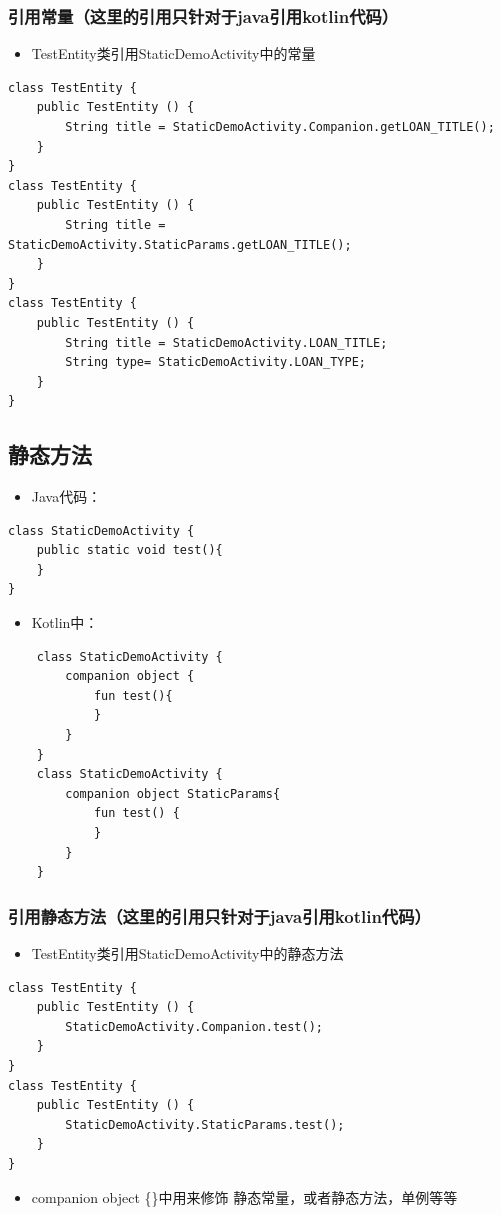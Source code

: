\documentclass[9pt, b5paper]{article}
\begin{document}
\subsubsection{引用常量（这里的引用只针对于java引用kotlin代码）}
\label{sec-2-1-3}
\begin{itemize}
\item TestEntity类引用StaticDemoActivity中的常量
\end{itemize}
\begin{verbatim}
class TestEntity {
    public TestEntity () {
        String title = StaticDemoActivity.Companion.getLOAN_TITLE();
    }
}
class TestEntity {
    public TestEntity () {
        String title = StaticDemoActivity.StaticParams.getLOAN_TITLE();
    }
}
class TestEntity {
    public TestEntity () {
        String title = StaticDemoActivity.LOAN_TITLE;
        String type= StaticDemoActivity.LOAN_TYPE;
    }
}
\end{verbatim}
\subsection{静态方法}
\label{sec-2-2}
\begin{itemize}
\item Java代码：
\end{itemize}
\begin{verbatim}
class StaticDemoActivity {
    public static void test(){
    } 
}
\end{verbatim}
\begin{itemize}
\item Kotlin中：
\end{itemize}
\begin{verbatim}
    class StaticDemoActivity {
        companion object {
            fun test(){
            }
        }
    }
    class StaticDemoActivity {
        companion object StaticParams{
            fun test() {
            }    
        }
    }
\end{verbatim}
\subsubsection{引用静态方法（这里的引用只针对于java引用kotlin代码）}
\label{sec-2-2-1}
\begin{itemize}
\item TestEntity类引用StaticDemoActivity中的静态方法
\end{itemize}
\begin{verbatim}
class TestEntity {
    public TestEntity () {
        StaticDemoActivity.Companion.test();
    }
}
class TestEntity {
    public TestEntity () {
        StaticDemoActivity.StaticParams.test();
    }
}
\end{verbatim}
\begin{itemize}
\item companion object \{\}中用来修饰 静态常量，或者静态方法，单例等等
\end{itemize}
\end{document}
